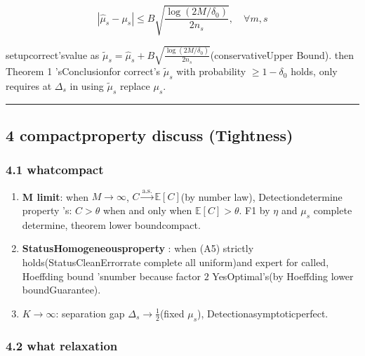 \documentclass[
  12pt,
]{article}
\begin{document}
\[|\hat{\mu}_s - \mu_s| \leq B \sqrt{\frac{\log(2M/\delta_0)}{2n_s}}, \quad \forall m, s\]

setupcorrect'svalue as 
\(\tilde{\mu}_s = \hat{\mu}_s + B\sqrt{\frac{\log(2M/\delta_0)}{2n_s}}\)(conservativeUpper Bound). then 
Theorem 1 'sConclusionfor correct's \(\tilde{\mu}_s\) with probability
\(\geq 1 - \delta_0\) holds, only requires at  \(\Delta_s\) in using  \(\tilde{\mu}_s\)
replace \(\mu_s\). 

\begin{center}\rule{0.5\linewidth}{0.5pt}\end{center}

\subsection{4 compactproperty discuss
(Tightness)}\label{ux7d27ux81f4ux6027ux8ba8ux8bba-tightness}

\subsubsection{4.1 whatcompact}\label{ux4f55ux65f6ux7d27ux81f4}

\begin{enumerate}
\def\labelenumi{\arabic{enumi}.}
\item
  \textbf{ M limit}: when 
  \(M \to \infty\), \(C \xrightarrow{\text{a.s.}} \mathbb{E}[C]\)(by number law), Detectiondetermine property 's: \(C > \theta\)
  when and only when  \(\mathbb{E}[C] > \theta\).  F1 by  \(\eta\) and  \(\mu_s\)
  complete determine, theorem lower boundcompact. 
\item
  \textbf{StatusHomogeneousproperty }: when  (A5)
  strictly holds(StatusCleanErrorrate complete all uniform)and expert for called, Hoeffding bound 'snumber because factor 
  \(2\) YesOptimal's(by  Hoeffding lower boundGuarantee). 
\item
  \textbf{\(K \to \infty\)}: separation gap \(\Delta_s \to \frac{1}{2}\)(fixed 
  \(\mu_s\)), Detectionasymptoticperfect. 
\end{enumerate}

\subsubsection{4.2 what relaxation}\label{ux4f55ux65f6ux677eux5f1b}
\end{document}
